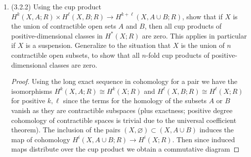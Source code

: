 \documentclass[11pt]{article}
\begin{document}
\begin{enumerate}
\begin{proof}
        We also have the isomorphism $H^j(\vee_i T_i)\cong \oplus_i \tilde H^j(T_i)\cong \oplus_i H^j(T_i)$ for $j\geq 1$. The induced map $q^\ast$ distributes over the cup product so we obtain a commutative diagram: %
        \[\begin{tikzcd}
            {\oplus_i H^1(T_i)\times \oplus_i H^1(T_i)} & {\oplus_i H^2(T_i)} \\
            {H^1(M_g)\times H^1(M_g)} & {H^2(M_g)}
            \arrow["{q^\ast\times q^\ast}", from=1-1, to=2-1]
            \arrow["\cup", from=1-1, to=1-2]
            \arrow["{q^\ast}", from=1-2, to=2-2]
            \arrow["\cup", from=2-1, to=2-2]
        \end{tikzcd}\] Let $\alpha_i,\beta_i$ generate $H^1(T_i)$ and $\gamma_i$ generate $H^2(T_i)$. We must then have that $\alpha_i\cup \alpha_j = 0$ and $\beta_i\cup\beta_j = 0$ for all $i,j$ and $\alpha_i\cup\beta_j = \delta_{ij}\gamma_i$ ($\beta_j\cup \alpha_i = -\delta_{ij}\gamma_i$) for all $i,j$. Then by the isomorphism of the first degree homology, we must have that the cup product of elements in $H^1(M_g)$ follow a similar rule: if $a_i,b_i$ are generators of $H^1(M_g)$ corresponding to $\alpha_i,\beta_i$ and $c$ generates $H^2(M_g)$ then we have that $a_i\cup a_j = 0$ and $b_i\cup b_j = 0$ for all $i,j$ and $a_i\cup b_j = \delta_{ij} c$ ($b_j\cup a_i = -\delta_{ij}c$) for all $i,j$. 
    \end{proof}
    \item (3.2.2) Using the cup product $H^k(X,A;R)\times H^\ell(X,B;R)\to H^{k+\ell}(X,A\cup B;R)$, show that if $X$ is the union of contractible open sets $A$ and $B$, then all cup products of positive-dimensional classes in $H^\ast(X;R)$ are zero. This applies in particular if $X$ is a suspension. Generalize to the situation that $X$ is the union of $n$ contractible open subsets, to show that all $n$-fold cup products of positive-dimensional classes are zero. \begin{proof}
        Using the long exact sequence in cohomology for a pair we have the isomorphisms $H^k(X,A;R)\cong H^k(X;R)$ and $H^\ell(X,B;R)\cong H^\ell(X;R)$ for positive $k,\ell$ since the terms for the homology of the subsets $A$ or $B$ vanish as they are contractible subspaces (plus exactness; positive degree cohomology of contractible spaces is trivial due to the universal coefficient theorem). The inclusion of the pairs $(X,\varnothing)\subset (X,A\cup B)$ induces the map of cohomology $H^i(X,A\cup B;R)\to H^i(X;R)$. Then since induced maps distribute over the cup product we obtain a commutative diagram %

\end{proof}
\end{enumerate}
\end{document}
